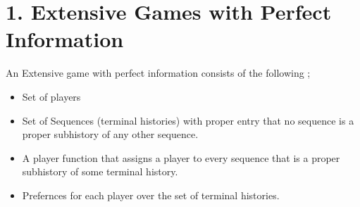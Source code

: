 \documentclass[10pt,leqno]{report}
\begin{document}
\section*{1. Extensive Games with Perfect Information}
An Extensive game with perfect information consists of the following ; 
\begin{itemize}
    \item Set of players 
    \item Set of Sequences (terminal histories) with proper entry that no sequence is a proper subhistory of any other sequence. 
    \item A player function that assigns a player to every sequence that is a proper subhistory of some terminal history. 
    \item Prefernces for each player over the set of terminal histories. 
\end{itemize}
\end{document}
